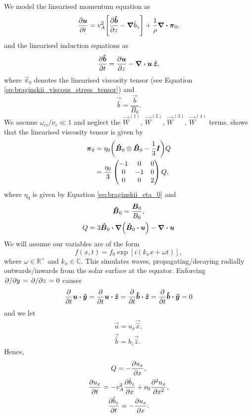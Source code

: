 We model the linearised momentum equation as
\begin{equation}
    \pdv{\boldsymbol{u}}{t}=v_A^2\qty[\pdv{\boldsymbol{\hat{b}}}{z}-\grad \hat{b}_z] + \frac{1}{\rho}\div{\boldsymbol{\pi}_0},
\end{equation}
and the linearised induction equations as
\begin{equation}
    \pdv{\boldsymbol{\hat{b}}}{t}=\pdv{\boldsymbol{u}}{z} - \div{\boldsymbol{u}}\,\boldsymbol{\hat{z}},
\end{equation}
where $\vec{\pi}_0$ denotes the linearised viscosity tensor (see Equation \ref{eq:braginskii_viscous_stress_tensor}) and
\begin{equation}
    \vec{\hat{b}} = \frac{\vec{b}}{B_0}.
\end{equation}
We assume $\omega_{ci}/\nu_i\ll1$ and neglect the $\vec{W}^{(1)}$, $\vec{W}^{(2)}$, $\vec{W}^{(3)}$, $\vec{W}^{(4)}$ terms. \citet{Mocanu2008} shows that the linearised viscosity tensor is given by
\begin{equation}
\begin{aligned}
    \boldsymbol{\pi}_0 &= \eta_0\qty(\boldsymbol{\hat{B}}_0 \otimes \boldsymbol{\hat{B}}_0 - \frac{1}{3}\boldsymbol{I})Q \\
    &=\frac{\eta_0}{3}\begin{pmatrix}
    -1 & 0  & 0 \\
    0  & -1 & 0 \\
    0  & 0  & 2  \\
    \end{pmatrix} Q,
\end{aligned} 
\end{equation}
where $\eta_0$ is given by Equation \eqref{eq:braginskii_eta_0} and 
\begin{gather}
    \vec{\hat{B}}_0 = \frac{\vec{B}_0}{B_0}, \\
    Q = 3\vec{\hat{B}}_0\vdot\grad(\vec{\hat{B}}_0\vdot\vec{u}) - \div{\vec{u}}
\end{gather}
We will assume our variables are of the form
\begin{equation}
    \label{eq:apdx_exp_form}
    f(x,t) = f_0\exp[i(k_x x + \omega t)],
\end{equation}
where $\omega\in \mathds{R}^+$ and $k_x\in \mathds{C}$. This simulates waves, propagating/decaying radially outwards/inwards from the solar surface at the equator. Enforcing $\pdv*{}{y}=\pdv*{}{z}=0$ causes
\[\pdv{}{t}\vec{u}\vdot\vec{\hat{y}}=\pdv{}{t}\vec{u}\vdot\vec{\hat{z}}=\pdv{}{t}\vec{\hat{b}}\vdot\vec{\hat{z}}=\pdv{}{t}\vec{\hat{b}}\vdot\vec{\hat{y}}=0\] 
and we let
\begin{gather}
    \vec{u} = u_x \vec{\hat{x}}, \\
    \vec{\hat{b}} = \hat{b}_z \vec{\hat{z}}.
\end{gather}
Hence,
\begin{gather}
    Q = -\pdv{u_x}{x}, \\
    \label{eq:ux_eqn1}
    \pdv{u_x}{t} = -v_A^2\pdv{\hat{b}_z}{x} + \nu_0\pdv[2]{u_x}{x}, \\
    \label{eq:bz_eqn1}
    \pdv{\hat{b}_z}{t} = -\pdv{u_x}{x}.
\end{gather}

